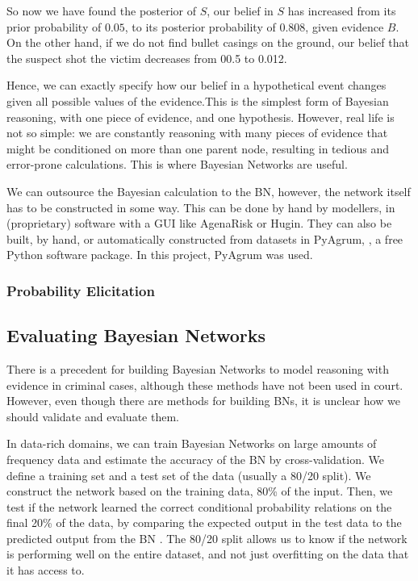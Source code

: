 \documentclass[11pt]{article}
\begin{document}
So now we have found the posterior of $S$, our belief in $S$ has increased from its prior probability of $0.05$, to its posterior probability of $0.808$, given evidence $B$. On the other hand, if we do not find bullet casings on the ground, our belief that the suspect shot the victim decreases from 00.5 to 0.012. 

Hence, we can exactly specify how our belief in a hypothetical event changes given all possible values of the evidence.This is the simplest form of Bayesian reasoning, with one piece of evidence, and one hypothesis. However, real life is not so simple: we are constantly reasoning with many pieces of evidence that might be conditioned on more than one parent node, resulting in tedious and error-prone calculations. This is where Bayesian Networks are useful. 

We can outsource the Bayesian calculation to the BN, however, the network itself has to be constructed in some way. This can be done by hand by modellers, in (proprietary) software with a GUI like AgenaRisk or Hugin. They can also be built, by hand, or automatically constructed from datasets in PyAgrum, \citep{pyagrum2020}, a free Python software package. In this project, PyAgrum was used.



\subsubsection{Probability Elicitation}


\subsection{Evaluating Bayesian Networks}

There is a precedent for building Bayesian Networks to model reasoning with evidence in criminal cases, although these methods have not been used in court. However, even though there are methods for building BNs, it is unclear how we should validate and evaluate them. 

In data-rich domains, we can train Bayesian Networks on large amounts of frequency data and estimate the accuracy of the BN by cross-validation. We define a training set and a test set of the data (usually a 80/20 split). We construct the network based on the training data, 80\% of the input. Then, we test if the network learned the correct conditional probability relations on the final 20\% of the data, by comparing the expected output in the test data to the predicted output from the BN \citep{chen2012}. The 80/20 split allows us to know if the network is performing well on the entire dataset, and not just overfitting on the data that it has access to.
\end{document}
